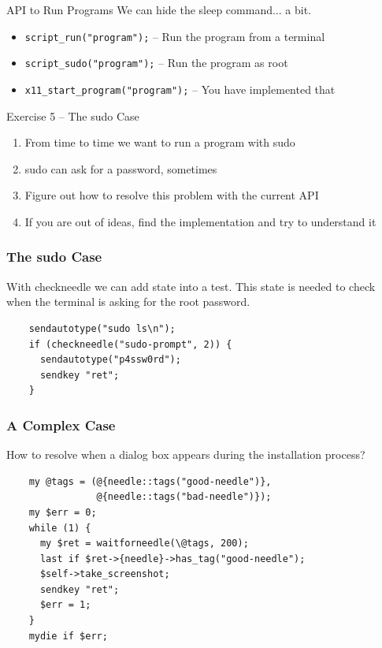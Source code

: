 \documentclass{beamer}
\begin{document}
\begin{frame}{API to Run Programs}
  We can hide the sleep command... a bit.
  \begin{itemize}
  \item \texttt{script\_run("program");} -- Run the program from a terminal
  \item \texttt{script\_sudo("program");} -- Run the program as root
  \item \texttt{x11\_start\_program("program");} -- You have implemented that
  \end{itemize}
\end{frame}

%
%
\begin{frame}{Exercise 5 -- The sudo Case}
  \begin{enumerate}
  \item From time to time we want to run a program with sudo
  \item sudo can ask for a password, sometimes
  \item Figure out how to resolve this problem with the current API
  \item If you are out of ideas, find the implementation and try to understand it
  \end{enumerate}
\end{frame}


\begin{frame}[fragile]
  \frametitle{The sudo Case}
  With checkneedle we can add state into a test. This state is needed
  to check when the terminal is asking for the root password.
  \lstset{style=myperl}
  \begin{lstlisting}
    sendautotype("sudo ls\n");
    if (checkneedle("sudo-prompt", 2)) {
      sendautotype("p4ssw0rd");
      sendkey "ret";
    }
  \end{lstlisting}
\end{frame}

\begin{frame}[fragile]
  \frametitle{A Complex Case}
  How to resolve when a dialog box appears during the installation process?
  \lstset{style=myperl}
  \begin{lstlisting}
    my @tags = (@{needle::tags("good-needle")},
                @{needle::tags("bad-needle")});
    my $err = 0;
    while (1) {
      my $ret = waitforneedle(\@tags, 200);
      last if $ret->{needle}->has_tag("good-needle");
      $self->take_screenshot;
      sendkey "ret";
      $err = 1;
    }
    mydie if $err;
  \end{lstlisting}
\end{frame}
\end{document}
